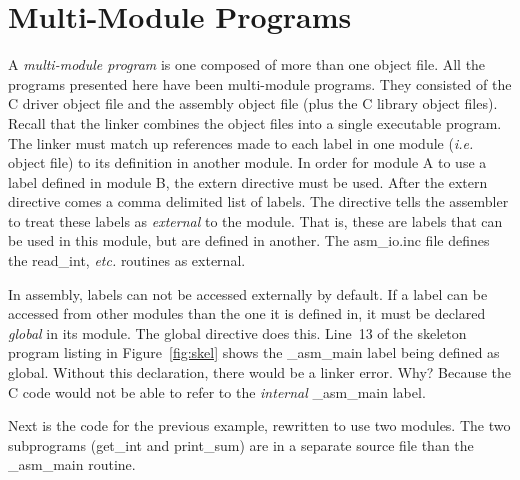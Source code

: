 \section{Multi-Module Programs}

A \emph{multi-module program} is one composed of more than one object
file.  All the programs presented here have been multi-module
programs. They consisted of the C driver object file and the assembly
object file (plus the C library object files). Recall that the linker
combines the object files into a single executable program. The linker
must match up references made to each label in one module (\emph{i.e.}
object file) to its definition in another module. In order for module
A to use a label defined in module B, the {\code extern} directive
must be used. After the {\code extern} 
directive comes a comma delimited list of labels. The directive tells
the assembler to treat these labels as \emph{external} to the
module. That is, these are labels that can be used in this module, but
are defined in another. The {\code asm\_io.inc} file defines the
{\code read\_int}, \emph{etc.} routines as external.

In assembly, labels can not be accessed externally by default. If a
label can be accessed from other modules than the one it is defined
in, it must be declared \emph{global} in its module. The {\code
global}  directive does this. Line~13 of the
skeleton program listing in Figure~\ref{fig:skel} shows the {\code
\_asm\_main} label being defined as global. Without this declaration,
there would be a linker error. Why? Because the C code would not be
able to refer to the \emph{internal} {\code \_asm\_main} label.

Next is the code for the previous example, rewritten to use two modules. The
two subprograms ({\code get\_int} and {\code print\_sum}) are in a separate
source file than the {\code \_asm\_main} routine.

